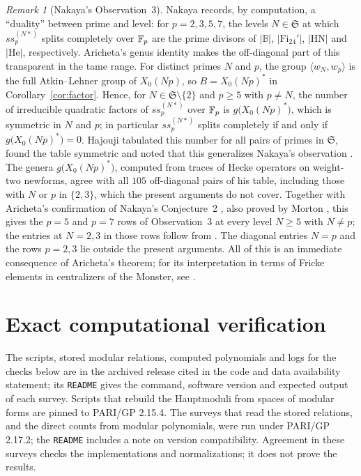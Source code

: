 \documentclass[11pt,a4paper]{article}
\theoremstyle{remark}\newtheorem{remark}[theorem]{Remark}
\numberwithin{equation}{section}
\begin{document}
\begin{remark}[Nakaya's Observation~3]\label{rem:obs3}
	Nakaya \cite[Section~4.4, Observation~3]{Nakaya} records, by computation, a ``duality'' between prime and level: for $p=2,3,5,7$, the levels $N\in\mathfrak S$ at which $ss_p^{(N*)}$ splits completely over $\mathbb F_p$ are the prime divisors of $|\mathbb B|$, $|\mathrm{Fi}_{24}'|$, $|\mathrm{HN}|$ and $|\mathrm{He}|$, respectively. Aricheta's genus identity makes the off-diagonal part of this transparent in the tame range. For distinct primes $N$ and $p$, the group $\langle w_N,w_p\rangle$ is the full Atkin--Lehner group of $X_0(Np)$, so $B=X_0(Np)^*$ in Corollary~\ref{cor:factor}. Hence, for $N\in\mathfrak S\setminus\{2\}$ and $p\geq5$ with $p\neq N$, the number of irreducible quadratic factors of $ss_p^{(N*)}$ over $\mathbb F_p$ is $g\bigl(X_0(Np)^*\bigr)$, which is symmetric in $N$ and $p$; in particular $ss_p^{(N*)}$ splits completely if and only if $g\bigl(X_0(Np)^*\bigr)=0$. Hajouji tabulated this number for all pairs of primes in $\mathfrak S$, found the table symmetric and noted that this generalizes Nakaya's observation \cite[Section~2.5 and Table~1]{Hajouji}. The genera $g\bigl(X_0(Np)^*\bigr)$, computed from traces of Hecke operators on weight-two newforms, agree with all $105$ off-diagonal pairs of his table, including those with $N$ or $p$ in $\{2,3\}$, which the present arguments do not cover. Together with Aricheta's confirmation of Nakaya's Conjecture~2 \cite[Remark~1.2 and Appendix~A]{Aricheta}, also proved by Morton \cite[Theorem~6]{MortonFricke}, this gives the $p=5$ and $p=7$ rows of Observation~3 at every level $N\geq5$ with $N\neq p$; the entries at $N=2,3$ in those rows follow from \cite[Theorem~5]{Nakaya}. The diagonal entries $N=p$ and the rows $p=2,3$ lie outside the present arguments. All of this is an immediate consequence of Aricheta's theorem; for its interpretation in terms of Fricke elements in centralizers of the Monster, see \cite[Theorem~1.3]{Aricheta}.
\end{remark}
	
\appendix
\section{Exact computational verification}\label{app:computation}
The scripts, stored modular relations, computed polynomials and logs for the checks below are in the archived release cited in the code and data availability statement; its \texttt{README} gives the command, software version and expected output of each survey. Scripts that rebuild the Hauptmoduli from spaces of modular forms are pinned to PARI/GP 2.15.4. The surveys that read the stored relations, and the direct counts from modular polynomials, were run under PARI/GP 2.17.2; the \texttt{README} includes a note on version compatibility. Agreement in these surveys checks the implementations and normalizations; it does not prove the results.
\end{document}
